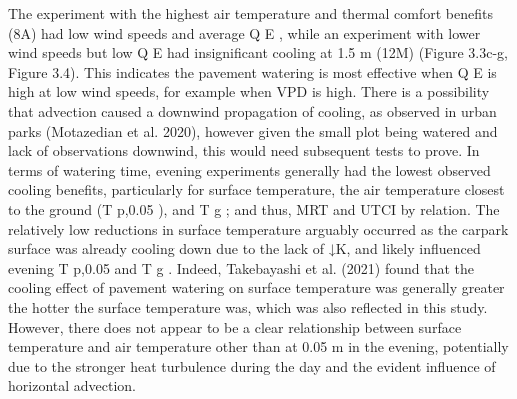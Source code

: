 \documentclass[final,3p,times,authoryear]{elsarticle}
\begin{document}
The experiment with the highest air temperature and thermal comfort benefits (8A) had
low wind speeds and average Q E , while an experiment with lower wind speeds but low
Q E had insignificant cooling at 1.5 m (12M) (Figure 3.3c-g, Figure 3.4). This indicates
the pavement watering is most effective when Q E is high at low wind speeds, for
example when VPD is high.
There is a possibility that advection caused a downwind propagation of cooling, as
observed in urban parks (Motazedian et al. 2020), however given the small plot being
watered and lack of observations downwind, this would need subsequent tests to prove.
In terms of watering time, evening experiments generally had the lowest observed
cooling benefits, particularly for surface temperature, the air temperature closest to the
ground (T p,0.05 ), and T g ; and thus, MRT and UTCI by relation. The relatively low
reductions in surface temperature arguably occurred as the carpark surface was already
cooling down due to the lack of ↓K, and likely influenced evening T p,0.05 and T g . Indeed,
Takebayashi et al. (2021) found that the cooling effect of pavement watering on surface
temperature was generally greater the hotter the surface temperature was, which was
also reflected in this study. However, there does not appear to be a clear relationship
between surface temperature and air temperature other than at 0.05 m in the evening,
potentially due to the stronger heat turbulence during the day and the evident influence
of horizontal advection.
\end{document}
